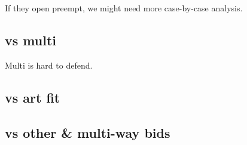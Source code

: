 If they open preempt, we might need more case-by-case analysis.


\subsection{vs multi}

Multi is hard to defend.


\subsection{vs art fit}


\subsection{vs other \& multi-way bids}

